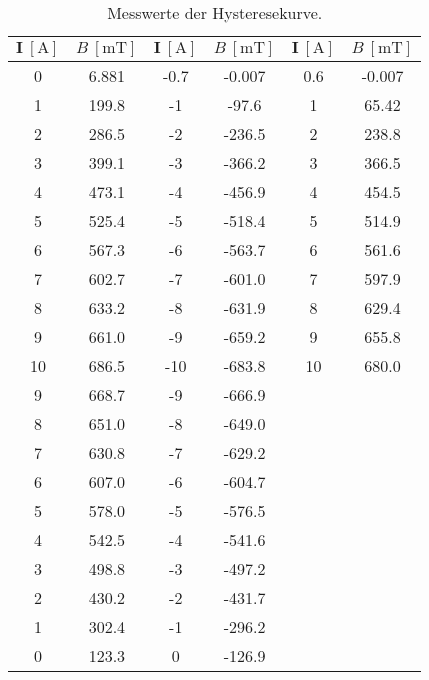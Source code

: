 \begin{table}
      \centering
      \caption{Messwerte der Hysteresekurve.}
      \label{tab:hystwerte}
      \begin{tabular}{S[table-format=2.0] S |S[table-format=2.1] S |S[table-format=2.1] S}
            \toprule
            {$\symbf{I} \: [\si{\ampere}]$}
            & {$B \: [\si{\milli\tesla}]$}
            & {$\symbf{I} \: [\si{\ampere}]$}
            & {$B \: [\si{\milli\tesla}]$}
            & {$\symbf{I} \: [\si{\ampere}]$}
            & {$B \: [\si{\milli\tesla}]$} \\
              & 6.881 & -0.7 & -0.007 & 0.6 & -0.007 \\
            1  & 199.8 & -1   & -97.6  & 1   & 65.42 \\
            2  & 286.5 & -2   & -236.5 & 2   & 238.8 \\
            3  & 399.1 & -3   & -366.2 & 3   & 366.5 \\
            4  & 473.1 & -4   & -456.9 & 4   & 454.5 \\
            5  & 525.4 & -5   & -518.4 & 5   & 514.9 \\
            6  & 567.3 & -6   & -563.7 & 6   & 561.6 \\
            7  & 602.7 & -7   & -601.0 & 7   & 597.9 \\
            8  & 633.2 & -8   & -631.9 & 8   & 629.4 \\
            9  & 661.0 & -9   & -659.2 & 9   & 655.8 \\
            10 & 686.5 & -10  & -683.8 & 10  & 680.0 \\
            9  & 668.7 & -9   & -666.9 & & \\
            8  & 651.0 & -8   & -649.0 & & \\
            7  & 630.8 & -7   & -629.2 & & \\
            6  & 607.0 & -6   & -604.7 & & \\
            5  & 578.0 & -5   & -576.5 & & \\
            4  & 542.5 & -4   & -541.6 & & \\
            3  & 498.8 & -3   & -497.2 & & \\
            2  & 430.2 & -2   & -431.7 & & \\
            1  & 302.4 & -1   & -296.2 & & \\
            0  & 123.3 &  0   & -126.9 & & \\
            \bottomrule
      \end{tabular}
\end{table}
\newpage
